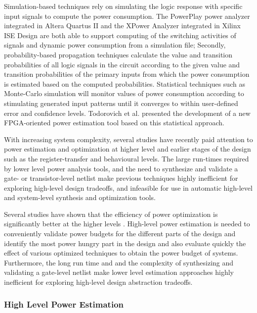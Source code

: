 Simulation-based techniques rely on simulating the logic response with specific input signals to compute the power consumption. 
The PowerPlay power analyzer integrated in Altera Quartus II \cite{ALTERA2010} and the XPower Analyzer integrated in Xilinx ISE Design \cite{XilinxXPOWERA2011} are both able to support computing of the switching activities of signals and dynamic power consumption from a simulation file; 
Secondly, probability-based propagation techniques calculate the value and transition probabilities of all logic signals in the circuit according to the given value and transition probabilities of the primary inputs from which the power consumption is estimated based on the computed probabilities.
Statistical techniques such as Monte-Carlo simulation will monitor values of power consumption according to stimulating generated input patterns until it converges to within user-defined error and confidence levels. Todorovich et al. \cite{Todorovich2005} presented the development of a new FPGA-oriented power estimation tool based on this statistical approach.

With increasing system complexity, several studies have recently paid attention to power estimation and optimization at higher level and earlier stages of the design such as the register-transfer and behavioural levels. The large run-times required by lower level power analysis tools, and the need to synthesize and validate a gate- or transistor-level netlist make previous techniques highly inefficient for exploring high-level design tradeoffs, and infeasible for use in automatic high-level and system-level synthesis and optimization tools.

Several studies have shown that the efficiency of power optimization is significantly better at the higher levels \cite{Landman1996,Gupta2000,Raghunathan2003,Reimer2006}.
High-level power estimation is needed to conveniently validate power budgets for the different parts of the design and identify the most power hungry part in the design and also evaluate quickly the effect of various optimized techniques to obtain the power budget of systems. 
Furthermore, the long run time and and the complexity of synthesizing and validating a gate-level netlist make lower level estimation approaches highly inefficient for exploring high-level design abstraction tradeoffs.

\subsubsection{High Level Power Estimation}

